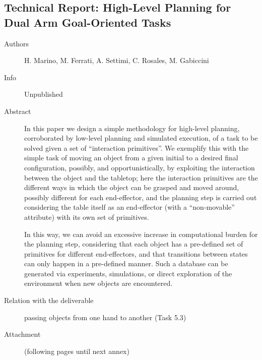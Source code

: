 \documentclass[a4paper,11pt,pdf]{pacmanreport}
\begin{document}
%

\subsection{Technical Report: High-Level Planning for Dual Arm Goal-Oriented Tasks} \label{ann:dualArmPlanning}
\begin{description}
    \item[Authors] H. Marino, M. Ferrati, A. Settimi, C. Rosales, M. Gabiccini
    \item[Info] Unpublished
    \item[Abstract]
    In this paper we design a simple methodology for high-level planning, corroborated by low-level planning and simulated execution, of a task to be solved given a set of ``interaction primitives''. We exemplify this with the simple task of moving an object from a given initial to a desired final configuration, possibly, and opportunistically, by exploiting the interaction between the object and the tabletop; here the interaction primitives are the different ways in which the object can be grasped and moved around, possibly different for each end-effector, and the planning step is carried out considering the table itself as an end-effector (with a ``non-movable'' attribute) with its own set of primitives.

In this way, we can avoid an excessive increase in computational burden for the planning step, considering that each object has a pre-defined set of primitives for different end-effectors, and that transitions between states can only happen in a pre-defined manner. Such a database can be generated via experiments, simulations, or direct exploration of the environment when new objects are encountered.
    \item[Relation with the deliverable] passing objects from one hand to another (Task 5.3)
    \item[Attachment] (following pages until next annex)
\end{description}
%
\end{document}
